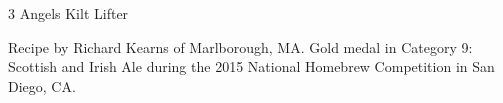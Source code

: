 \stylesection{\styleweeheavy}

\begin{recipe}{3 Angels Kilt Lifter}

\begin{aboutblock}
Recipe by Richard Kearns of Marlborough, MA. Gold medal in Category 9: Scottish
and Irish Ale during the 2015 National Homebrew Competition in San Diego, CA.
\sourceaha
\end{aboutblock}


\begin{methodandtiming}

\begin{mashsteps}
\end{mashsteps}

\begin{fermentationsteps}
\end{fermentationsteps}

\end{methodandtiming}

\recipebreak

\begin{ingredientsblock}

\begin{malts}
\end{malts}

\begin{hops}
\end{hops}


\end{ingredientsblock}

\end{recipe}

